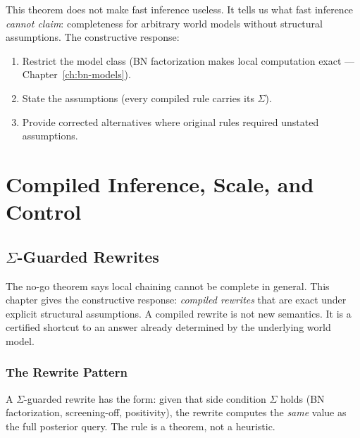 \documentclass[11pt,openany]{report}
\begin{document}
\noindent
This theorem does not make fast inference useless.  It tells us what
fast inference \emph{cannot claim}: completeness for arbitrary world
models without structural assumptions.  The constructive response:
\begin{enumerate}
\item Restrict the model class (BN factorization makes local
  computation exact --- Chapter~\ref{ch:bn-models}).
\item State the assumptions (every compiled rule carries its $\Sigma$).
\item Provide corrected alternatives where original rules required
  unstated assumptions.
\end{enumerate}



\part{Compiled Inference, Scale, and Control}
\label{part:compiled}

\chapter{\texorpdfstring{$\Sigma$}{Sigma}-Guarded Rewrites}
\label{ch:sigma-rewrites}

The no-go theorem says local chaining cannot be complete in general.
This chapter gives the constructive response: \emph{compiled
rewrites} that are exact under explicit structural assumptions.  A
compiled rewrite is not new semantics.  It is a certified shortcut to
an answer already determined by the underlying world model.

\section{The Rewrite Pattern}

A $\Sigma$-guarded rewrite has the form: given that side condition
$\Sigma$ holds (BN factorization, screening-off, positivity), the
rewrite computes the \emph{same} value as the full posterior query.
The rule is a theorem, not a heuristic.
\end{document}
